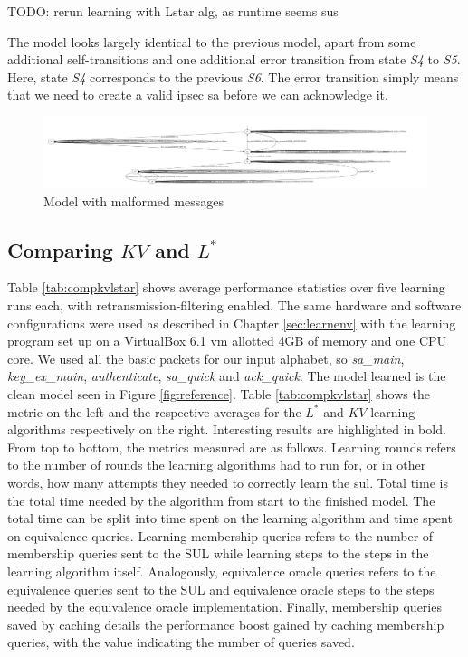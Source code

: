 TODO: rerun learning with Lstar alg, as runtime seems sus

The model looks largely identical to the previous model, apart from some additional self-transitions and one additional error transition from state \emph{S4} to \emph{S5}. Here, state \emph{S4} corresponds to the previous \emph{S6}. The error transition simply means that we need to create a valid \ac{ipsec} \ac{sa} before we can acknowledge it.

\begin{figure}
	\centering
	\includegraphics[width=\linewidth]{images/WithFilterWithErrors}
	\caption{Model with malformed messages}
	\label{fig:withfilterwitherrors}
\end{figure}

\subsection{Comparing $KV$ and $L^*$} \label{subsec:comp_kv_lstar}
Table \ref{tab:compkvlstar} shows average performance statistics over five learning runs each, with retransmission-filtering enabled. The same hardware and software configurations were used as described in Chapter \ref{sec:learnenv} with the learning program set up on a VirtualBox 6.1 \ac{vm} allotted 4GB of memory and one CPU core. We used all the basic packets for our input alphabet, so
\emph{sa\_main}, \emph{key\_ex\_main}, \emph{authenticate}, \emph{sa\_quick} and \emph{ack\_quick}. The model learned is the clean model seen in Figure \ref{fig:reference}. Table \ref{tab:compkvlstar} shows the metric on the left and the respective averages for the $L^*$ and $KV$ learning algorithms respectively on the right. Interesting results are highlighted in bold. From top to bottom, the metrics measured are as follows.
Learning rounds refers to the number of rounds the learning algorithms had to run for, or in other words, how many attempts they needed to correctly learn the \ac{sul}. Total time is the total time needed by the algorithm from start to the finished model. The total time can be split into time spent on the learning algorithm and time spent on equivalence queries. Learning membership queries refers to the number of membership queries sent to the SUL while learning steps to the steps in the learning algorithm itself. Analogously, equivalence oracle queries refers to the equivalence queries sent to the SUL and equivalence oracle steps to the steps needed by the equivalence oracle implementation. Finally, membership queries saved by caching details the performance boost gained by caching membership queries, with the value indicating the number of queries saved.

